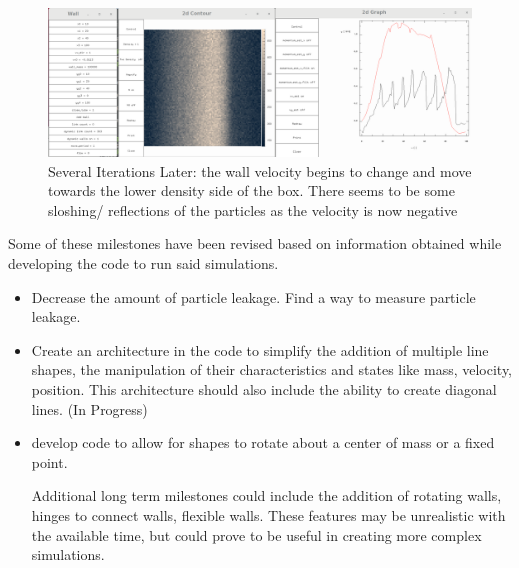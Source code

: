 \documentclass{article}
\begin{document}
\begin{itemize}
\begin{figure}

\includegraphics[scale=0.2]{ms2p1.png}
\caption{\label{fig} Several Iterations Later: the wall velocity begins to change and move towards the lower density side of the box. There seems to be some sloshing/ reflections of the particles as the velocity is now negative}
\end{figure} 

  
\end{itemize}
Some of these milestones have been revised based on information obtained while developing the code to run said simulations. 
\begin{itemize}
  
  \item Decrease the amount of particle leakage. Find a way to measure particle leakage.
  
  \item Create an architecture in the code to simplify the addition of multiple line shapes, the manipulation of their characteristics and states like mass, velocity, position. This architecture should also include the ability to create diagonal lines. (In Progress)
  
  \item develop code to allow for shapes to rotate about a center of mass or a fixed point.
  
 
Additional long term milestones could include the addition of rotating walls, hinges to connect walls, flexible walls. These features may be unrealistic with the available time, but could prove to be useful in creating more complex simulations.
\end{itemize}
\end{document}

